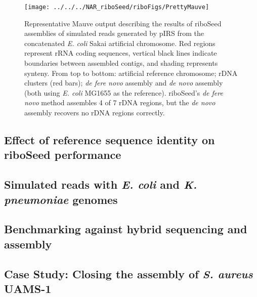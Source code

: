 \documentclass[10pt]{article}
\begin{document}
\begin{linenumbers}
\begin{figure}[!b]
    \centering
    \hspace*{-2cm}\texttt{[image: ../../../NAR\_riboSeed/riboFigs/PrettyMauve]}
    \caption{Representative Mauve output describing the results of riboSeed assemblies of simulated reads generated by pIRS from the concatenated \textit{E. coli} Sakai artificial chromosome. Red regions represent rRNA coding sequences, vertical black lines indicate boundaries between assembled contigs, and shading represents synteny. From top to bottom: artificial reference chromosome; rDNA clusters (red bars); \textit{de fere novo} assembly and \textit{de novo} assembly (both using \textit{E. coli } MG1655 as the reference). riboSeed's \textit{de fere novo} method assembles 4 of 7 rDNA regions, but the \textit{de novo} assembly recovers no rDNA regions correctly.
}
\label{fig:artificial}
\end{figure}






\subsection*{Effect of reference sequence identity on riboSeed performance}






\subsection*{Simulated reads with \textit{E. coli} and \textit{K. pneumoniae} genomes}



\subsection*{Benchmarking against hybrid sequencing and assembly}




\subsection*{Case Study: Closing the assembly of \textit{S. aureus} UAMS-1}


\end{linenumbers}
\end{document}
